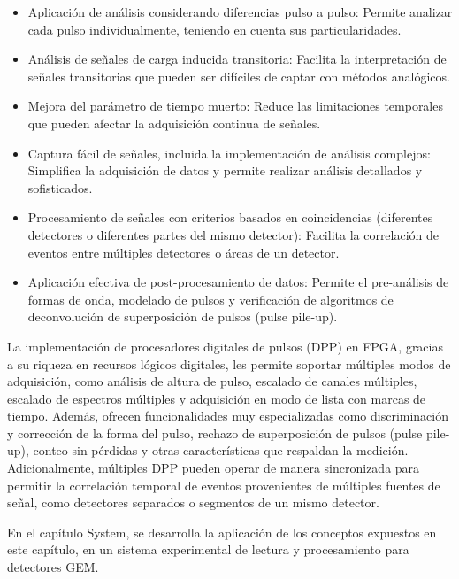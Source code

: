 \documentclass[]{book}
\begin{document}
\begin{itemize}
    \item Aplicación de análisis considerando diferencias pulso a pulso: Permite analizar cada pulso individualmente, teniendo en cuenta sus particularidades.
    \item Análisis de señales de carga inducida transitoria: Facilita la interpretación de señales transitorias que pueden ser difíciles de captar con métodos analógicos.
    \item  Mejora del parámetro de tiempo muerto: Reduce las limitaciones temporales que pueden afectar la adquisición continua de señales.
    \item Captura fácil de señales, incluida la implementación de análisis complejos: Simplifica la adquisición de datos y permite realizar análisis detallados y sofisticados.
    \item Procesamiento de señales con criterios basados en coincidencias (diferentes detectores o diferentes partes del mismo detector): Facilita la correlación de eventos entre múltiples detectores o áreas de un detector.
    \item Aplicación efectiva de post-procesamiento de datos: Permite el pre-análisis de formas de onda, modelado de pulsos y verificación de algoritmos de deconvolución de superposición de pulsos (pulse pile-up).

\end{itemize}

\noindent La implementación de procesadores digitales de pulsos (DPP) en FPGA, gracias a su riqueza en recursos lógicos digitales, les permite soportar múltiples modos de adquisición, como análisis de altura de pulso, escalado de canales múltiples, escalado de espectros múltiples y adquisición en modo de lista con marcas de tiempo. Además, ofrecen funcionalidades muy especializadas como discriminación y corrección de la forma del pulso, rechazo de superposición de pulsos (pulse pile-up), conteo sin pérdidas y otras características que respaldan la medición. Adicionalmente, múltiples DPP pueden operar de manera sincronizada para permitir la correlación temporal de eventos provenientes de múltiples fuentes de señal, como detectores separados o segmentos de un mismo detector. 

\noindent En el capítulo System, se desarrolla la aplicación de los conceptos expuestos en este capítulo, en un sistema experimental de lectura y procesamiento para detectores GEM.
\end{document}
